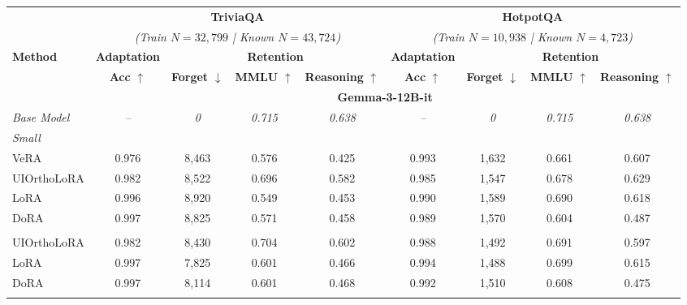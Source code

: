 \begin{table}[t]
\centering
\small
\setlength{\tabcolsep}{5pt}
\begin{adjustbox}{max width=\linewidth}
\begin{tabular}{l | c ccc | c ccc}
\toprule
& \multicolumn{4}{c|}{\textbf{TriviaQA}} & \multicolumn{4}{c}{\textbf{HotpotQA}} \\
& \multicolumn{4}{c|}{\textit{(Train $N=32{,}799$ | Known $N=43{,}724$)}} & \multicolumn{4}{c}{\textit{(Train $N=10{,}938$ | Known $N=4{,}723$)}} \\
\cmidrule(lr){2-5} \cmidrule(lr){6-9}
\multirow{2}{*}{\textbf{Method}} & \textbf{Adaptation} & \multicolumn{3}{c|}{\textbf{Retention}} & \textbf{Adaptation} & \multicolumn{3}{c}{\textbf{Retention}} \\
\cmidrule(lr){2-2} \cmidrule(lr){3-5} \cmidrule(lr){6-6} \cmidrule(lr){7-9}
& \textbf{Acc} $\uparrow$ & \textbf{Forget} $\downarrow$ & \textbf{MMLU} $\uparrow$ & \textbf{Reasoning} $\uparrow$ & \textbf{Acc} $\uparrow$ & \textbf{Forget} $\downarrow$ & \textbf{MMLU} $\uparrow$ & \textbf{Reasoning} $\uparrow$ \\
\midrule
\multicolumn{1}{c}{} & \multicolumn{8}{c}{\textbf{Gemma-3-12B-it}} \\
\midrule
\addlinespace[0.3ex]
\rowcolor{gray!10} \textit{Base Model} & \textit{--} & \textit{0} & \textit{0.715} & \textit{0.638} & \textit{--} & \textit{0} & \textit{0.715} & \textit{0.638} \\
\midrule
\multicolumn{9}{l}{\textit{Small}} \\
VeRA         & 0.976 & 8,463 & 0.576 & 0.425 & 0.993 & 1,632 & 0.661 & 0.607 \\
UIOrthoLoRA & 0.982 & 8,522 & 0.696 & 0.582 & 0.985 & 1,547 & 0.678 & 0.629 \\
LoRA         & 0.996 & 8,920 & 0.549 & 0.453 & 0.990 & 1,589 & 0.690 & 0.618 \\
DoRA         & 0.997 & 8,825 & 0.571 & 0.458 & 0.989 & 1,570 & 0.604 & 0.487 \\
\addlinespace
\multicolumn{9}{l}{\textit{Medium}} \\
UIOrthoLoRA & 0.982 & 8,430 & 0.704 & 0.602 & 0.988 & 1,492 & 0.691 & 0.597 \\
LoRA         & 0.997 & 7,825 & 0.601 & 0.466 & 0.994 & 1,488 & 0.699 & 0.615 \\
DoRA         & 0.997 & 8,114 & 0.601 & 0.468 & 0.992 & 1,510 & 0.608 & 0.475 \\
\addlinespace
\multicolumn{9}{l}{\textit{Large}} \\

\end{tabular}
\end{adjustbox}
\end{table}
